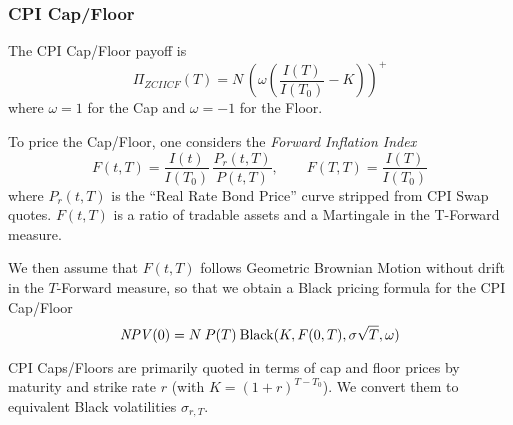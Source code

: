 \subsubsection{CPI Cap/Floor}
\label{pricing:inf_zciicapfloor}

The CPI Cap/Floor payoff is
$$
\Pi_{ZCIICF}(T) = N\,\left(\omega\left(\frac{I(T)}{I(T_0)} - K\right)\right)^+
$$
where $\omega=1$ for the Cap and $\omega=-1$ for the Floor.

\medskip
To price the Cap/Floor, one considers the {\em Forward Inflation Index} 
$$
F(t,T) = \frac{I(t)}{I(T_0)}\,\frac{P_r(t,T)}{P(t,T)}, \qquad  F(T,T) = \frac{I(T)}{I(T_0)}
$$
where $P_r(t,T)$ is the ``Real Rate Bond Price'' curve stripped from CPI Swap quotes. 
$F(t,T)$ is a ratio of tradable assets and a Martingale in the T-Forward measure. 

\medskip
We then assume that $F(t,T)$ follows Geometric Brownian Motion without drift in the 
$T$-Forward measure, so that we obtain a Black pricing formula for the CPI Cap/Floor
$$
\mathit{NPV}(0) = N\:P(T)\:\mbox{Black}(K, F(0,T),\sigma\sqrt{T},\omega)
$$

\medskip
CPI Caps/Floors are primarily quoted in terms of cap and floor prices by maturity and 
strike rate $r$ (with $K=(1+r)^{T-T_0}$). We convert them to equivalent 
Black volatilities $\sigma_{r,T}$. 

